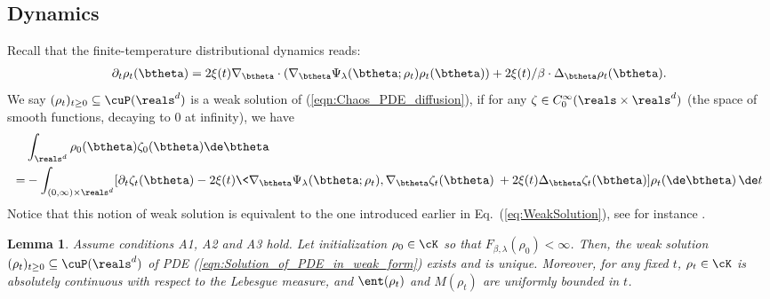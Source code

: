 \documentclass[11pt]{article}
\newtheorem{lemma}{Lemma}
\begin{document}
\subsection{Dynamics}
\label{sec:Dynamics_finite_T}


Recall that the finite-temperature distributional dynamics reads:
%
\begin{align}\label{eqn:Chaos_PDE_diffusion}
\partial_t \rho_t(\btheta) = 2 \xi(t) \nabla_\btheta \cdot (\nabla_\btheta \Psi_\lambda(\btheta; \rho_t) \rho_t(\btheta)) + 2\xi(t)/\beta \cdot \Delta_\btheta \rho_t(\btheta). 
\end{align}
We say $(\rho_t)_{t \ge 0} \subseteq \cuP(\reals^d)$ is a weak solution of (\ref{eqn:Chaos_PDE_diffusion}), if for any $\zeta \in C_0^\infty(\reals \times \reals^d)$ (the space of smooth functions, decaying to $0$ at infinity), we have
\begin{equation}\label{eqn:Solution_of_PDE_in_weak_form}
\begin{aligned}
 & \int_{\reals^d} \rho_0(\btheta) \zeta_0(\btheta) \de \btheta\\
=&- \int_{(0, \infty) \times \reals^d} [ \partial_t \zeta_t(\btheta) - 2 \xi(t) \< \nabla_\btheta \Psi_\lambda (\btheta; \rho_t), \nabla_\btheta \zeta_t(\btheta)\> + 2 \xi(t)\Delta_\btheta \zeta_t(\btheta)] 
\rho_t(\de \btheta)\,  \de t
\end{aligned}
\end{equation}
%
Notice that this notion of weak solution is equivalent to the one introduced earlier in Eq.~(\ref{eq:WeakSolution}), see for instance
\cite[Proposition 4.2]{santambrogio2015optimal}.




\begin{lemma}\label{lemma:AbsolutelyContinuous}
Assume conditions {\sf A1}, {\sf A2} and {\sf A3} hold. Let initialization $\rho_0 \in \cK$ so that $F_{\beta, \lambda}(\rho_0) < \infty$. Then, the weak solution $(\rho_t)_{t \ge 0} \subseteq \cuP(\reals^d)$ of PDE (\ref{eqn:Solution_of_PDE_in_weak_form}) exists and is unique. Moreover, for any fixed $t$, $\rho_t \in \cK$ is absolutely continuous with respect to the Lebesgue measure, and $\ent(\rho_t)$ and $M(\rho_t)$ are uniformly bounded in $t$. 
\end{lemma}
\end{document}
